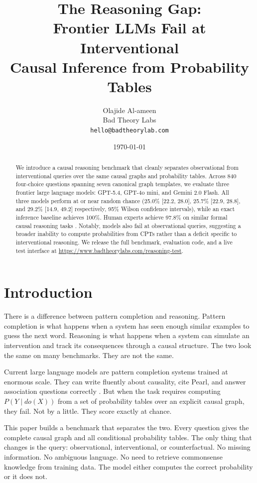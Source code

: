 \documentclass[11pt,a4paper]{article}
\title{The Reasoning Gap:\\[4pt]Frontier LLMs Fail at Interventional\\[2pt]Causal Inference from Probability Tables}
\author{%
  Olajide Al-ameen\\
  Bad Theory Labs\\
  \texttt{hello@badtheorylab.com}
}
\date{\today}
\begin{document}
\maketitle

\begin{abstract}
We introduce a causal reasoning benchmark that cleanly separates observational from interventional queries over the same causal graphs and probability tables. Across 840 four-choice questions spanning seven canonical graph templates, we evaluate three frontier large language models: GPT-5.4, GPT-4o mini, and Gemini 2.0 Flash. All three models perform at or near random chance (25.0\% [22.2, 28.0], 25.7\% [22.9, 28.8], and 29.2\% [14.9, 49.2] respectively, 95\% Wilson confidence intervals), while an exact inference baseline achieves 100\%. Human experts achieve 97.8\% on similar formal causal reasoning tasks \cite{counterbench}. Notably, models also fail at observational queries, suggesting a broader inability to compute probabilities from CPTs rather than a deficit specific to interventional reasoning. We release the full benchmark, evaluation code, and a live test interface at \url{https://www.badtheorylabs.com/reasoning-test}.
\end{abstract}

\section{Introduction}

There is a difference between pattern completion and reasoning. Pattern completion is what happens when a system has seen enough similar examples to guess the next word. Reasoning is what happens when a system can simulate an intervention and track its consequences through a causal structure. The two look the same on many benchmarks. They are not the same.

Current large language models are pattern completion systems trained at enormous scale. They can write fluently about causality, cite Pearl, and answer association questions correctly \cite{jin2024cladder}. But when the task requires computing $P(Y \mid do(X))$ from a set of probability tables over an explicit causal graph, they fail. Not by a little. They score exactly at chance.

This paper builds a benchmark that separates the two. Every question gives the complete causal graph and all conditional probability tables. The only thing that changes is the query: observational, interventional, or counterfactual. No missing information. No ambiguous language. No need to retrieve commonsense knowledge from training data. The model either computes the correct probability or it does not.
\end{document}

